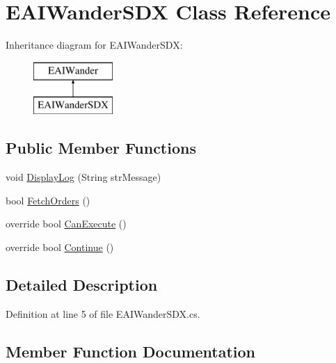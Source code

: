 \hypertarget{class_e_a_i_wander_s_d_x}{}\section{E\+A\+I\+Wander\+S\+DX Class Reference}
\label{class_e_a_i_wander_s_d_x}
Inheritance diagram for E\+A\+I\+Wander\+S\+DX\+:\begin{figure}[H]
\begin{center}
\leavevmode
\includegraphics[height=2.000000cm]{class_e_a_i_wander_s_d_x}
\end{center}
\end{figure}
\subsection*{Public Member Functions}
\begin{DoxyCompactItemize}
\item 
void \mbox{\hyperlink{class_e_a_i_wander_s_d_x_a91e335aef3d29f6e6b1d9317b7ba2b50}{Display\+Log}} (String str\+Message)
\item 
bool \mbox{\hyperlink{class_e_a_i_wander_s_d_x_a564d337c452713856e337d239de300ec}{Fetch\+Orders}} ()
\item 
override bool \mbox{\hyperlink{class_e_a_i_wander_s_d_x_ae4a69878b4e5b005fa95116187c0f4f2}{Can\+Execute}} ()
\item 
override bool \mbox{\hyperlink{class_e_a_i_wander_s_d_x_a72ffd17db1e7bde82569e03f8273af29}{Continue}} ()
\end{DoxyCompactItemize}


\subsection{Detailed Description}


Definition at line 5 of file E\+A\+I\+Wander\+S\+D\+X.\+cs.



\subsection{Member Function Documentation}
\mbox{\label{class_e_a_i_wander_s_d_x_ae4a69878b4e5b005fa95116187c0f4f2}} 
